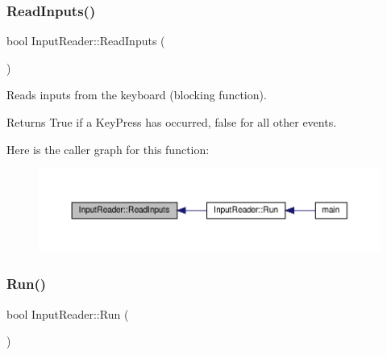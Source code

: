 \subsubsection{\texorpdfstring{Read\+Inputs()}{ReadInputs()}}
{\footnotesize\ttfamily bool Input\+Reader\+::\+Read\+Inputs (\begin{DoxyParamCaption}{ }\end{DoxyParamCaption})}

Reads inputs from the keyboard (blocking function). \begin{DoxyReturn}{Returns}
True if a Key\+Press has occurred, false for all other events. 
\end{DoxyReturn}
Here is the caller graph for this function\+:
\nopagebreak
\begin{figure}[H]
\begin{center}
\leavevmode
\includegraphics[width=350pt]{classInputReader_a541f5d60fa0d9ee786d82f1541485a4a_icgraph}
\end{center}
\end{figure}
\mbox{\label{classInputReader_a258e1e58806e172a4339bb2aec9a85f0}} 
\subsubsection{\texorpdfstring{Run()}{Run()}}
{\footnotesize\ttfamily bool Input\+Reader\+::\+Run (\begin{DoxyParamCaption}{ }\end{DoxyParamCaption})}

